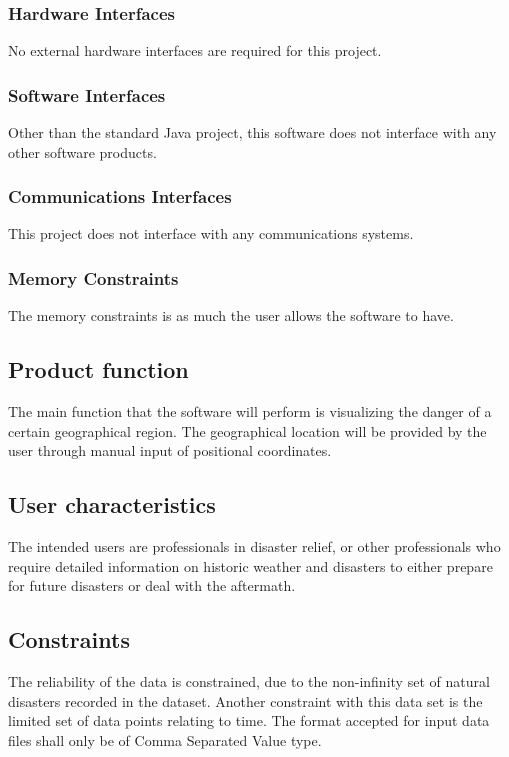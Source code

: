 \documentclass{article}
\begin{document}
\subsubsection{Hardware Interfaces}
No external hardware interfaces are required for this project.

\subsubsection{Software Interfaces}
Other than the standard Java project, this software does not
interface with any other software products.

\subsubsection{Communications Interfaces}
This project does not interface with any communications systems.
\subsubsection{Memory Constraints}
The memory constraints is as much the user allows the software to have.

\subsection{Product function}
The main function that the software will perform is visualizing the
danger of a certain geographical region. The geographical location will be 
provided by the user through manual input of positional coordinates.

\subsection{User characteristics}

The intended users are professionals in disaster relief, or other professionals
who require detailed information on historic weather and disasters to either
prepare for future disasters or deal with the aftermath.

\subsection{Constraints}
The reliability of the data is constrained, due to the non-infinity set of natural disasters recorded
in the dataset. Another constraint with this data set is the limited set of data points relating to time.
The format accepted for input data files shall only be of Comma Separated Value type.
\end{document}
